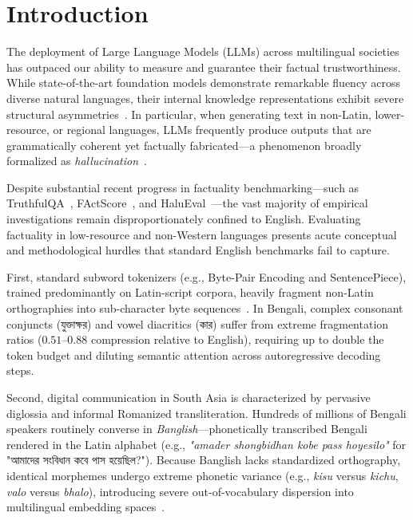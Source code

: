\documentclass[11pt,a4paper,twocolumn]{article}
\DeclareRobustCommand{\foreignlanguage}[2]{#2}
\let\bengalifont\relax
\DeclareRobustCommand{\foreignlanguage}[2]{{\bengalifont #2}}
\DeclareRobustCommand{\foreignlanguage}[2]{#2}
\begin{document}
\section{Introduction}
\label{sec:introduction}

The deployment of Large Language Models (LLMs) across multilingual societies has outpaced our ability to measure and guarantee their factual trustworthiness. While state-of-the-art foundation models demonstrate remarkable fluency across diverse natural languages, their internal knowledge representations exhibit severe structural asymmetries~\citep{ahuja2023mega,bang2023multitask}. In particular, when generating text in non-Latin, lower-resource, or regional languages, LLMs frequently produce outputs that are grammatically coherent yet factually fabricated---a phenomenon broadly formalized as \emph{hallucination}~\citep{maynez2020faithfulness,ji2023survey,tonmoy2024comprehensive}.

Despite substantial recent progress in factuality benchmarking---such as TruthfulQA~\citep{lin2022truthfulqa}, FActScore~\citep{min2023factscore}, and HaluEval~\citep{li2023halueval}---the vast majority of empirical investigations remain disproportionately confined to English. Evaluating factuality in low-resource and non-Western languages presents acute conceptual and methodological hurdles that standard English benchmarks fail to capture.

First, standard subword tokenizers (e.g., Byte-Pair Encoding and SentencePiece), trained predominantly on Latin-script corpora, heavily fragment non-Latin orthographies into sub-character byte sequences~\citep{hasan2023banglatokenizer}. In Bengali, complex consonant conjuncts (\foreignlanguage{bengali}{যুক্তাক্ষর}) and vowel diacritics (\foreignlanguage{bengali}{কার}) suffer from extreme fragmentation ratios ($0.51$--$0.88$ compression relative to English), requiring up to double the token budget and diluting semantic attention across autoregressive decoding steps.

Second, digital communication in South Asia is characterized by pervasive diglossia and informal Romanized transliteration. Hundreds of millions of Bengali speakers routinely converse in \emph{Banglish}---phonetically transcribed Bengali rendered in the Latin alphabet (e.g., \emph{"amader shongbidhan kobe pass hoyesilo"} for \foreignlanguage{bengali}{"আমাদের সংবিধান কবে পাস হয়েছিল?"}). Because Banglish lacks standardized orthography, identical morphemes undergo extreme phonetic variance (e.g., \emph{kisu} versus \emph{kichu}, \emph{valo} versus \emph{bhalo}), introducing severe out-of-vocabulary dispersion into multilingual embedding spaces~\citep{saha2024robustness,chowdhury20245dialects}.
\end{document}
